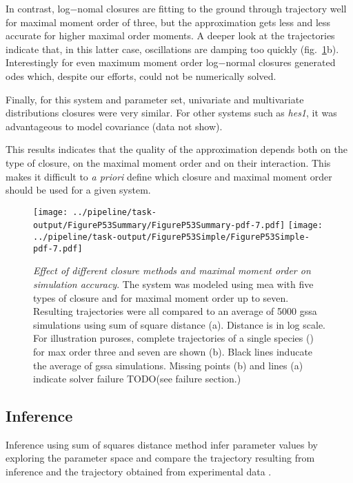 In contrast, log$-$nomal closures are fitting to the ground through trajectory well for maximal moment order of three,
but the approximation gets less and less accurate for higher maximal order moments.
A deeper look at the trajectories indicate that, in this latter case,
oscillations are damping too quickly (fig.~\ref{fig:max_order_and_closure_on_distance}b).
Interestingly for even maximum moment order log$-$normal closures generated \gls{ode}s which,
despite our efforts, could not be numerically solved.

Finally, for this system and parameter set, univariate and multivariate distributions closures were very similar.
For other systems such as \emph{hes1}, it was advantageous to model covariance (data not show).

This results indicates that the quality of the approximation depends both on the type of closure, on the maximal moment order and on their interaction. This makes it difficult to \emph{a priori} define which closure and maximal moment order should be used for a given system.

\begin{figure}

\texttt{[image: ../pipeline/task-output/FigureP53Summary/FigureP53Summary-pdf-7.pdf]}
\texttt{[image: ../pipeline/task-output/FigureP53Simple/FigureP53Simple-pdf-7.pdf]}
\caption{\emph{Effect of different closure methods and maximal moment order on simulation accuracy}.
The \pft system was modeled using \gls{mea} with five types of closure and for maximal moment order up to seven.
Resulting trajectories were all compared to an average of 5000 \gls{gssa} simulations using sum of square distance (a).
Distance is in log scale.
For illustration puroses, complete trajectories of a single species (\pft) for max order three and seven are shown (b).
Black lines inducate the average of \gls{gssa} simulations. Missing points (b) and lines (a) indicate solver failure
TODO(see failure section.)}

\label{fig:max_order_and_closure_on_distance}
\end{figure}

\subsection{Inference}
Inference using sum of squares distance method infer parameter values by exploring the parameter space and compare the trajectory resulting from inference and the trajectory obtained from experimental data .


